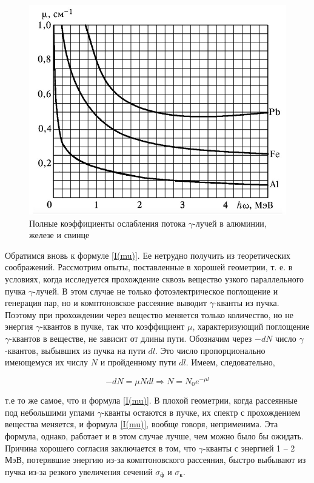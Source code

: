 \documentclass[a4paper,12pt]{report}
\begin{document}
	\begin{figure}[h!]
		\centering
		\includegraphics[width=0.6\linewidth]{3.jpg}
		\caption{Полные коэффициенты ослабления потока $\gamma$-лучей в алюминии, железе и свинце}
		\label{ris mu}
	\end{figure}
	
	
	Обратимся вновь к формуле \eqref{I(mu)}. Ее нетрудно получить из теоретических соображений. Рассмотрим опыты, поставленные в хорошей
	геометрии, т. е. в условиях, когда исследуется прохождение сквозь вещество узкого параллельного пучка $\gamma$-лучей. В этом случае не только
	фотоэлектрическое поглощение и генерация пар, но и комптоновское
	рассеяние выводит $\gamma$-кванты из пучка.
	Поэтому при прохождении через вещество меняется только количество, но не энергия $\gamma$-квантов в пучке, так что коэффициент $ \mu $, характеризующий поглощение $\gamma$-квантов в веществе, не зависит от длины
	пути. Обозначим через $ -dN $ число $\gamma$-квантов, выбывших из пучка на
	пути $ dl $. Это число пропорционально имеющемуся их числу $ N $ и пройденному пути $ dl $. Имеем, следовательно,
	
	\begin{equation}\label{N}
	-dN = \mu N dl \Rightarrow N = N_0 e^{-\mu l}
	\end{equation}
	
	т.е то же самое, что и формула \eqref{I(mu)}. В плохой геометрии, когда рассеянные под небольшими углами
	$\gamma$-кванты остаются в пучке, их спектр с прохождением вещества меняется, и формула \eqref{I(mu)}, вообще говоря, неприменима. Эта формула, однако, работает и в этом случае лучше, чем можно было бы ожидать. Причина хорошего согласия заключается в том, что $\gamma$-кванты с энергией 1 -- 2 МэВ, потерявшие энергию из-за комптоновского рассеяния,
	быстро выбывают из пучка из-за резкого увеличения сечений $ \sigma_{\text{ф}} $ и $ \sigma_{\text{к}} $.
	
\end{document}
